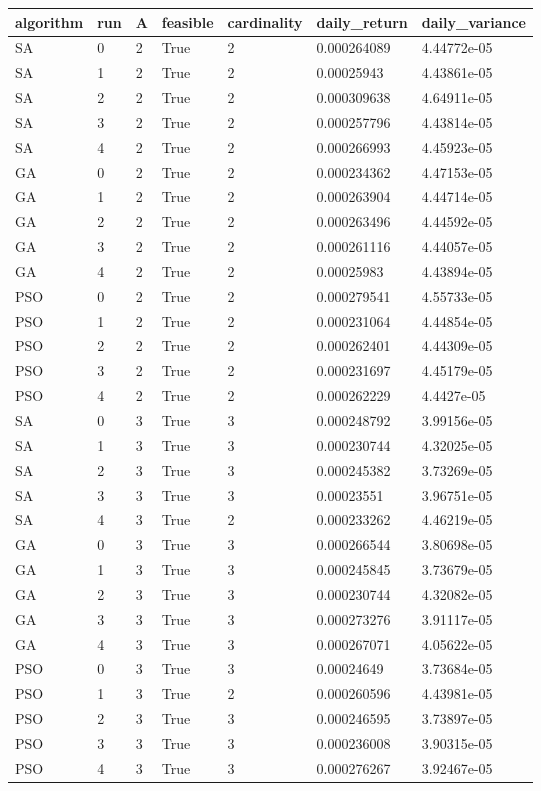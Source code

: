 \begin{tabular}{lllllll}
\toprule
algorithm & run & A & feasible & cardinality & daily\_return & daily\_variance \\
\midrule
SA & 0 & 2 & True & 2 & 0.000264089 & 4.44772e-05 \\
SA & 1 & 2 & True & 2 & 0.00025943 & 4.43861e-05 \\
SA & 2 & 2 & True & 2 & 0.000309638 & 4.64911e-05 \\
SA & 3 & 2 & True & 2 & 0.000257796 & 4.43814e-05 \\
SA & 4 & 2 & True & 2 & 0.000266993 & 4.45923e-05 \\
GA & 0 & 2 & True & 2 & 0.000234362 & 4.47153e-05 \\
GA & 1 & 2 & True & 2 & 0.000263904 & 4.44714e-05 \\
GA & 2 & 2 & True & 2 & 0.000263496 & 4.44592e-05 \\
GA & 3 & 2 & True & 2 & 0.000261116 & 4.44057e-05 \\
GA & 4 & 2 & True & 2 & 0.00025983 & 4.43894e-05 \\
PSO & 0 & 2 & True & 2 & 0.000279541 & 4.55733e-05 \\
PSO & 1 & 2 & True & 2 & 0.000231064 & 4.44854e-05 \\
PSO & 2 & 2 & True & 2 & 0.000262401 & 4.44309e-05 \\
PSO & 3 & 2 & True & 2 & 0.000231697 & 4.45179e-05 \\
PSO & 4 & 2 & True & 2 & 0.000262229 & 4.4427e-05 \\
SA & 0 & 3 & True & 3 & 0.000248792 & 3.99156e-05 \\
SA & 1 & 3 & True & 3 & 0.000230744 & 4.32025e-05 \\
SA & 2 & 3 & True & 3 & 0.000245382 & 3.73269e-05 \\
SA & 3 & 3 & True & 3 & 0.00023551 & 3.96751e-05 \\
SA & 4 & 3 & True & 2 & 0.000233262 & 4.46219e-05 \\
GA & 0 & 3 & True & 3 & 0.000266544 & 3.80698e-05 \\
GA & 1 & 3 & True & 3 & 0.000245845 & 3.73679e-05 \\
GA & 2 & 3 & True & 3 & 0.000230744 & 4.32082e-05 \\
GA & 3 & 3 & True & 3 & 0.000273276 & 3.91117e-05 \\
GA & 4 & 3 & True & 3 & 0.000267071 & 4.05622e-05 \\
PSO & 0 & 3 & True & 3 & 0.00024649 & 3.73684e-05 \\
PSO & 1 & 3 & True & 2 & 0.000260596 & 4.43981e-05 \\
PSO & 2 & 3 & True & 3 & 0.000246595 & 3.73897e-05 \\
PSO & 3 & 3 & True & 3 & 0.000236008 & 3.90315e-05 \\
PSO & 4 & 3 & True & 3 & 0.000276267 & 3.92467e-05 \\
\bottomrule
\end{tabular}
